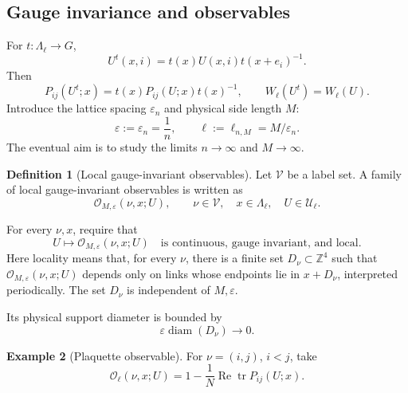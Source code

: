 \documentclass[10pt,reqno]{amsart}
\theoremstyle{definition}
\newtheorem{definition}{Definition}[section]
\newtheorem{example}[definition]{Example}
\theoremstyle{remark}
\numberwithin{equation}{section}
\numberwithin{figure}{section}
\newcommand{\Z}{\mathbb Z}
\newcommand{\e}{\varepsilon}
\DeclareMathOperator{\tr}{tr}
\begin{document}
\subsection{Gauge invariance and observables}
For $t:\Lambda_\ell\to G$,
\begin{equation}\label{eq:display-020}
U^t(x,i)=t(x)U(x,i)t(x+e_i)^{-1}.
\end{equation}
Then
\begin{equation}\label{eq:display-021}
P_{ij}(U^t;x)=t(x)P_{ij}(U;x)t(x)^{-1},
\qquad W_\ell(U^t)=W_\ell(U).
\end{equation}
Introduce the lattice spacing $\e_n$ and physical side length $M$:
\begin{equation}\label{eq:display-022}
\e:=\e_n=\frac1n,
\qquad \ell:=\ell_{n,M}=M/\e_n.
\end{equation}
The eventual aim is to study the limits $n\to\infty$ and $M\to\infty$.

\begin{definition}[Local gauge-invariant observables]
Let $\mathcal V$ be a label set. A family of local gauge-invariant observables is written as
\begin{equation}\label{eq:display-023}
\mathcal O_{M,\e}(\nu,x;U),
\qquad\nu\in\mathcal V,\quad x\in\Lambda_\ell,\quad U\in\mathcal U_\ell.
\end{equation}

For every $\nu,x$, require that
\begin{equation}\label{eq:display-024}
U\longmapsto\mathcal O_{M,\e}(\nu,x;U)
\quad\text{is continuous, gauge invariant, and local.}
\end{equation}
Here locality means that, for every $\nu$, there is a finite set $D_\nu\subset\Z^4$ such that
$\mathcal O_{M,\e}(\nu,x;U)$ depends only on links whose endpoints lie in $x+D_\nu$, interpreted periodically.
The set $D_\nu$ is independent of $M,\e$.

Its physical support diameter is bounded by
\begin{equation}\label{eq:display-025}
\e\operatorname{diam}(D_\nu)\longrightarrow0.
\end{equation}
\end{definition}

\begin{example}[Plaquette observable] For $\nu=(i,j)$, $i<j$, take
\begin{equation}\label{eq:display-026}
\mathcal O_\ell(\nu,x;U)
 =1-\frac1N\operatorname{Re}\tr P_{ij}(U;x).
\end{equation}

\end{example}
\end{document}
